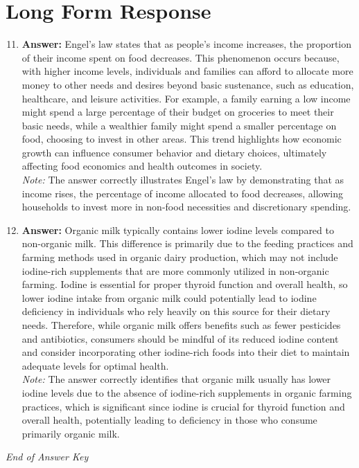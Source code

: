 \documentclass[12pt]{article}
\begin{document}
\section*{Long Form Response}
\begin{enumerate}[label=\arabic*.]
\setcounter{enumi}{10}
\item \textbf{Answer:} Engel's law states that as people's income increases, the proportion of their income spent on food decreases. This phenomenon occurs because, with higher income levels, individuals and families can afford to allocate more money to other needs and desires beyond basic sustenance, such as education, healthcare, and leisure activities. For example, a family earning a low income might spend a large percentage of their budget on groceries to meet their basic needs, while a wealthier family might spend a smaller percentage on food, choosing to invest in other areas. This trend highlights how economic growth can influence consumer behavior and dietary choices, ultimately affecting food economics and health outcomes in society.
\\ \textit{Note:} The answer correctly illustrates Engel's law by demonstrating that as income rises, the percentage of income allocated to food decreases, allowing households to invest more in non-food necessities and discretionary spending.
\item \textbf{Answer:} Organic milk typically contains lower iodine levels compared to non-organic milk. This difference is primarily due to the feeding practices and farming methods used in organic dairy production, which may not include iodine-rich supplements that are more commonly utilized in non-organic farming. Iodine is essential for proper thyroid function and overall health, so lower iodine intake from organic milk could potentially lead to iodine deficiency in individuals who rely heavily on this source for their dietary needs. Therefore, while organic milk offers benefits such as fewer pesticides and antibiotics, consumers should be mindful of its reduced iodine content and consider incorporating other iodine-rich foods into their diet to maintain adequate levels for optimal health.
\\ \textit{Note:} The answer correctly identifies that organic milk usually has lower iodine levels due to the absence of iodine-rich supplements in organic farming practices, which is significant since iodine is crucial for thyroid function and overall health, potentially leading to deficiency in those who consume primarily organic milk.
\end{enumerate}

\vfill
\noindent\textit{End of Answer Key}
\end{document}
